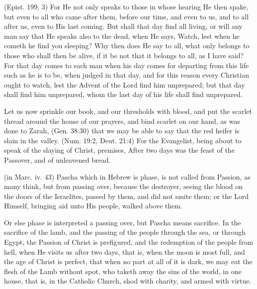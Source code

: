  (Epist. 199, 3) For He not only speaks to those in whose hearing He then spake, but even to all who came after them, before our time, and even to us, and to all after us, even to His last coming. But shall that day find all living, or will any man say that He speaks also to the dead, when He says, Watch, lest when he cometh he find you sleeping? Why then does He say to all, what only belongs to those who shall then be alive, if it be not that it belongs to all, as I have said? For that day comes to each man when his day comes for departing from this life such as he is to be, when judged in that day, and for this reason every Christian ought to watch, lest the Advent of the Lord find him unprepared; but that day shall find him unprepared, whom the last day of his life shall find unprepared.


 

 Let us now sprinkle our book, and our thresholds with blood, and put the scarlet thread around the house of our prayers, and bind scarlet on our hand, as was done to Zarah, (Gen. 38:30) that we may be able to say that the red heifer is slain in the valley. (Num. 19:2, Deut. 21:4) For the Evangelist, being about to speak of the slaying of Christ, premises, After two days was the feast of the Passover, and of unleavened bread.

 (in Marc. iv. 43) Pascha which in Hebrew is phase, is not called from Passion, as many think, but from passing over, because the destroyer, seeing the blood on the doors of the Israelites, passed by them, and did not smite them; or the Lord Himself, bringing aid unto His people, walked above them.

 Or else phase is interpreted a passing over, but Pascha means sacrifice. In the sacrifice of the lamb, and the passing of the people through the sea, or through Egypt, the Passion of Christ is prefigured, and the redemption of the people from hell, when He visits us after two days, that is, when the moon is most full, and the age of Christ is perfect, that when no part at all of it is dark, we may eat the flesh of the Lamb without spot, who taketh away the sins of the world, in one house, that is, in the Catholic Church, shod with charity, and armed with virtue.

